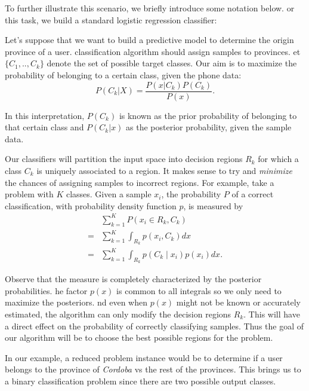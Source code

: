 To further illustrate this scenario, we briefly introduce some notation below.
or this task, we build a standard logistic regression classifier:

Let's suppose that we want to build a predictive model to determine the origin province of a user.
 classification algorithm should assign samples to provinces.
et $\{C_1,..,C_k\}$ denote the set of possible target classes.
Our aim is to maximize the probability of belonging to a certain class, given the phone data:
\begin{equation}
P(C_k| X) = \frac{P(x|C_k)P(C_k)}{P(x)} .
\end{equation}

In this interpretation, $P(C_k)$ is known as the prior probability of belonging to that certain class and $P(C_k|x)$ as the posterior probability, given the sample data.

Our classifiers will partition the input space into decision regions $R_k$ for which a class $C_k$ is uniquely associated to a region.
It makes sense to try and \textit{minimize} the chances of assigning samples to incorrect regions.
For example, take a problem with $K$ classes.
Given a sample $x_i$, the probability $P$ of a correct classification, with probability density function $p$, is measured by
\begin{equation}\label{eq:goodclassification-equation}
\begin{split}
  & \sum_{k=1}^{K} P(x_i \in R_k, C_k ) \\
= & \sum_{k=1}^{K} \int_{R_k}p(x_i,C_k) dx \\
= & \sum_{k=1}^{K} \int_{R_k}p(C_k \mid x_i) p(x_i) dx .
\end{split}
\end{equation}

Observe that the measure is completely characterized by the posterior probabilities.
he factor $p(x)$ is common to all integrals so we only need to maximize the posteriors.
nd even when $p(x)$ might not be known or accurately estimated, the algorithm can only modify the decision regions $R_k$.
This will have a direct effect on the probability of correctly classifying samples.
Thus the goal of our algorithm will be to choose the best possible regions for the problem.

In our example, a reduced problem instance would be to determine if a user belongs to the province of \textit{Cordoba} vs the rest of the provinces.
This brings us to a binary classification problem since there are two possible output classes.


